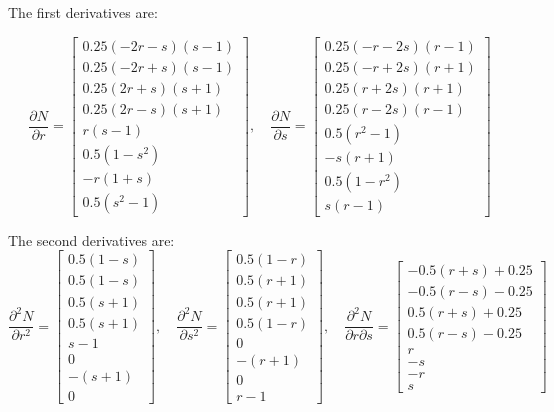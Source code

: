 The first derivatives are:

\[
\frac{\partial N}{\partial r} =
\begin{bmatrix}
0.25(-2r - s)(s - 1) \\
0.25(-2r + s)(s - 1) \\
0.25(2r + s)(s + 1) \\
0.25(2r - s)(s + 1) \\
r(s - 1) \\
0.5(1 - s^2) \\
-r(1 + s) \\
0.5(s^2 - 1)
\end{bmatrix}, \quad
\frac{\partial N}{\partial s} =
\begin{bmatrix}
0.25(-r - 2s)(r - 1) \\
0.25(-r + 2s)(r + 1) \\
0.25(r + 2s)(r + 1) \\
0.25(r - 2s)(r - 1) \\
0.5(r^2 - 1) \\
-s(r + 1) \\
0.5(1 - r^2) \\
s(r - 1)
\end{bmatrix}
\]

The second derivatives are:
\[
\frac{\partial^2 N}{\partial r^2} =
\begin{bmatrix}
0.5 (1 - s) \\
0.5 (1 - s) \\
0.5 (s + 1) \\
0.5 (s + 1) \\
s - 1 \\
0 \\
- (s + 1) \\
0
\end{bmatrix}, \quad
\frac{\partial^2 N}{\partial s^2} =
\begin{bmatrix}
0.5 (1 - r) \\
0.5 (r + 1) \\
0.5 (r + 1) \\
0.5 (1 - r) \\
0 \\
-(r + 1) \\
0 \\
r - 1
\end{bmatrix}, \quad
\frac{\partial^2 N}{\partial r \partial s} =
\begin{bmatrix}
-0.5 (r + s) + 0.25 \\
-0.5 (r - s) - 0.25 \\
0.5 (r + s) + 0.25 \\
0.5 (r - s) - 0.25 \\
r \\
-s \\
-r \\
s
\end{bmatrix}
\]

